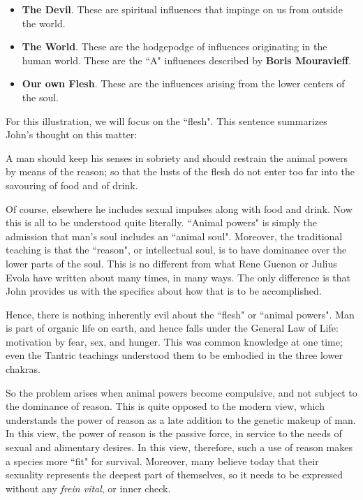 \begin{itemize}
\item \textbf{The Devil}. These are spiritual influences that impinge on us from outside the world. 
\item \textbf{The World}. These are the hodgepodge of influences originating in the human world. These are the ``A" influences described by \textbf{Boris Mouravieff}. 
\item \textbf{Our own Flesh}. These are the influences arising from the lower centers of the soul. 
\end{itemize}
For this illustration, we will focus on the ``flesh". This sentence summarizes John's thought on this matter:

\begin{quotex}
A man should keep his senses in sobriety and should restrain the animal powers by means of the reason; so that the lusts of the flesh do not enter too far into the savouring of food and of drink. 

\end{quotex}
Of course, elsewhere he includes sexual impulses along with food and drink. Now this is all to be understood quite literally. ``Animal powers" is simply the admission that man's soul includes an ``animal soul". Moreover, the traditional teaching is that the ``reason", or intellectual soul, is to have dominance over the lower parts of the soul. This is no different from what Rene Guenon or Julius Evola have written about many times, in many ways. The only difference is that John provides us with the specifics about how that is to be accomplished.

Hence, there is nothing inherently evil about the ``flesh" or ``animal powers". Man is part of organic life on earth, and hence falls under the General Law of Life: motivation by fear, sex, and hunger. This was common knowledge at one time; even the Tantric teachings understood them to be embodied in the three lower chakras.

So the problem arises when animal powers become compulsive, and not subject to the dominance of reason. This is quite opposed to the modern view, which understands the power of reason as a late addition to the genetic makeup of man. In this view, the power of reason is the passive force, in service to the needs of sexual and alimentary desires. In this view, therefore, such a use of reason makes a species more ``fit" for survival. Moreover, many believe today that their sexuality represents the deepest part of themselves, so it needs to be expressed without any \emph{frein vital}, or inner check.


